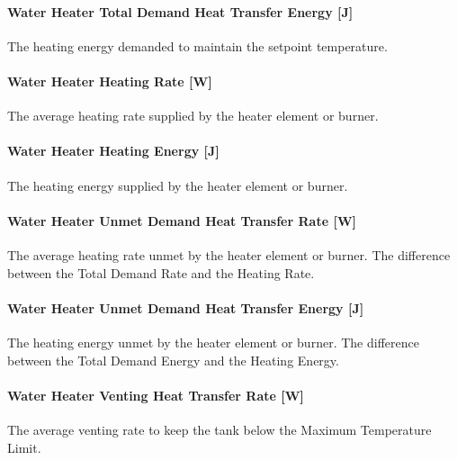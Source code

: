 \paragraph{Water Heater Total Demand Heat Transfer Energy {[}J{]}}\label{water-heater-total-demand-heat-transfer-energy-j}

The heating energy demanded to maintain the setpoint temperature.

\paragraph{Water Heater Heating Rate {[}W{]}}\label{water-heater-heating-rate-w-000}

The average heating rate supplied by the heater element or burner.

\paragraph{Water Heater Heating Energy {[}J{]}}\label{water-heater-heating-energy-j-000}

The heating energy supplied by the heater element or burner.

\paragraph{Water Heater Unmet Demand Heat Transfer Rate {[}W{]}}\label{water-heater-unmet-demand-heat-transfer-rate-w}

The average heating rate unmet by the heater element or burner. The difference between the Total Demand Rate and the Heating Rate.

\paragraph{Water Heater Unmet Demand Heat Transfer Energy {[}J{]}}\label{water-heater-unmet-demand-heat-transfer-energy-j}

The heating energy unmet by the heater element or burner. The difference between the Total Demand Energy and the Heating Energy.

\paragraph{Water Heater Venting Heat Transfer Rate {[}W{]}}\label{water-heater-venting-heat-transfer-rate-w}

The average venting rate to keep the tank below the Maximum Temperature Limit.

